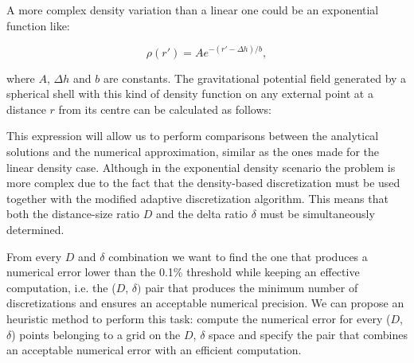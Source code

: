 \documentclass[extra]{gji}
\begin{document}
A more complex density variation than a linear one could be an 
exponential function like:

\begin{equation}
    \rho(r') = Ae^{-(r' - \Delta h)/b},
\end{equation}

\noindent where $A$, $\Delta h$ and $b$ are constants.
The gravitational potential field generated by a spherical shell with 
this kind of density function on any external point at a distance $r$ 
from its centre can be calculated as follows:


This expression will allow us  to perform comparisons between the 
analytical solutions and the numerical approximation, similar as the 
ones made for the linear density case.
Although in the exponential density scenario the problem is more 
complex due to the fact that the density-based discretization must be 
used together with the modified adaptive discretization algorithm.
This means that both the distance-size ratio $D$ and the delta ratio 
$\delta$ must be simultaneously determined.

From every $D$ and $\delta$ combination we want to find the one that 
produces a numerical error lower than the 0.1\% threshold while keeping 
an effective computation, i.e. the ($D$, $\delta)$ pair that produces 
the minimum number of discretizations and ensures an acceptable 
numerical precision.
We can propose an heuristic method to perform this task: compute the 
numerical error for every ($D$, $\delta$) points belonging to a grid on 
the $D$, $\delta$ space and specify the pair that combines an 
acceptable numerical error with an efficient computation.
\end{document}
